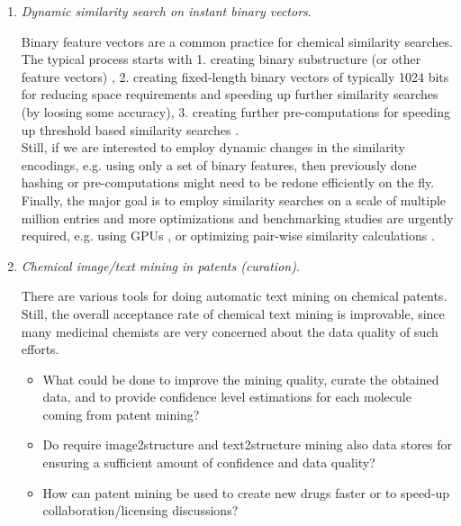 \documentclass{sig-alternate}
\begin{document}
\begin{enumerate}
%
%
\item \emph{Dynamic similarity search on instant binary vectors}.

  Binary feature vectors are a common practice for chemical similarity
  searches. The typical process starts with 1. creating binary
  substructure (or other feature vectors) \cite{citeulike:8530538},
  2. creating fixed-length binary vectors of typically 1024 bits for
  reducing space requirements and speeding up further similarity
  searches (by loosing some accuracy), 3. creating further
  pre-computations for speeding up threshold based similarity searches
  \cite{doi:10.1021/ci800076s}.\\  Still, if we are interested to employ
  dynamic changes in the similarity encodings, e.g. using only a set
  of binary features, then previously done hashing or pre-computations
  might need to be redone efficiently on the fly. Finally, the major
  goal is to employ similarity searches \cite{doi:10.1021/ci200235e}
  on a scale of multiple million entries and more optimizations and
  benchmarking studies are urgently required, e.g. using GPUs
  \cite{doi:10.1021/ci1004948}, or optimizing pair-wise similarity
  calculations \cite{MINF:MINF201100050}.
%

\item \emph{Chemical image/text mining in patents (curation)}.

  There are various tools for doing automatic text mining on chemical
  patents. Still, the overall acceptance rate of chemical text mining
  is improvable, since many medicinal chemists are very concerned
  about the data quality of such efforts.

  \begin{itemize}
  \item What could be done to improve the mining quality, curate the
    obtained data, and to provide confidence level estimations for
    each molecule coming from patent mining?
  \item Do require image2structure and text2structure mining also data
    stores for ensuring a sufficient amount of confidence and data
    quality?
  \item How can patent mining be used to create new drugs faster or to
    speed-up collaboration/licensing discussions?
 \end{itemize}


\end{enumerate}
\end{document}
